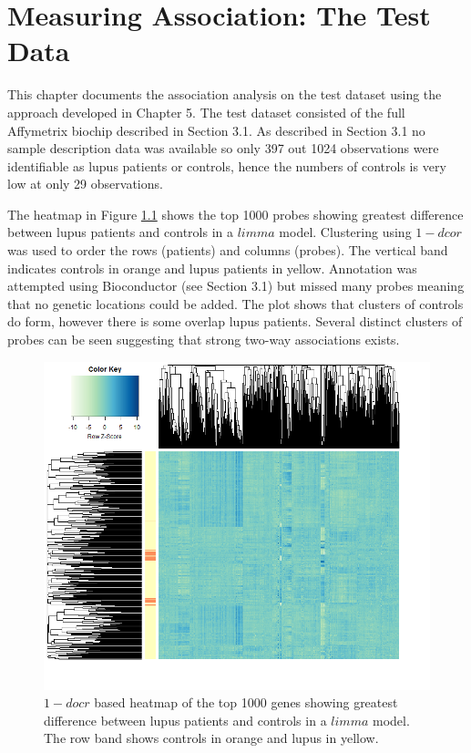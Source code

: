 \documentclass[a4paper, 12pt]{report}
\begin{document}

\chapter{Measuring Association: The Test Data}
This chapter documents the association analysis on the test dataset using the approach developed in Chapter 5. The test dataset consisted of the full Affymetrix biochip described in Section 3.1. As described in Section 3.1 no sample description data was available so only 397 out 1024 observations were identifiable as lupus patients or controls, hence the numbers of controls is very low at only 29 observations.

The heatmap in Figure \ref{F:bigHeat} shows the top 1000 probes showing greatest difference between lupus patients and controls in a $limma$ model. Clustering using $1 - dcor$ was used to order the rows (patients) and columns (probes). The vertical band indicates controls in orange and lupus patients in yellow. Annotation was attempted using Bioconductor (see Section 3.1) but missed many probes meaning that no genetic locations could be added. The plot shows that clusters of controls do form, however there is some overlap lupus patients. Several distinct clusters of probes can be seen suggesting that strong two-way associations exists.

\begin{figure}[h]
\begin{centering}
\includegraphics[width=\textwidth]{bigHeatSafe}
\caption{$1-docr$ based heatmap of the top 1000 genes showing greatest difference between lupus patients and controls in a $limma$ model. The row band shows controls in orange and lupus in yellow.} 
\label{F:bigHeat}
\end{centering}
\end{figure}
\end{document}
